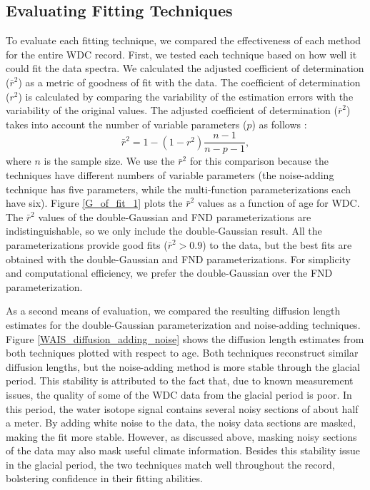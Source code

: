 \documentclass[draft, jgrga]{AGUTeX}
\begin{document}
\begin{article}
\section{Evaluating Fitting Techniques}
To evaluate each fitting technique, we compared the effectiveness of each method for the entire WDC record. First, we tested each technique based on how well it could fit the data spectra. We calculated the adjusted coefficient of determination ($\bar{r}^2$) as a metric of goodness of fit with the data. The coefficient of determination ($r^2$) is calculated by comparing the variability of the estimation errors with the variability of the original values. The adjusted coefficient of determination ($\bar{r}^2$) takes into account the number of variable parameters ($p$) as follows \citep{Theil1961}:
\begin{equation}
\bar{r}^2 = 1 - (1 -r^2) \frac{n - 1}{n - p - 1},
\end{equation}
where $n$ is the sample size. We use the $\bar{r}^2$ for this comparison because the techniques have different numbers of variable parameters (the noise-adding technique has five parameters, while the multi-function parameterizations each have six). Figure \ref{G_of_fit_1} plots the $\bar{r}^2$ values as a function of age for WDC. The $\bar{r}^2$ values of the double-Gaussian and FND parameterizations are indistinguishable, so we only include the double-Gaussian result. All the parameterizations provide good fits ($\bar{r}^2 > 0.9$) to the data, but the best fits are obtained with the double-Gaussian and FND parameterizations. For simplicity and computational efficiency, we prefer the double-Gaussian over the FND parameterization.

As a second means of evaluation, we compared the resulting diffusion length estimates for the double-Gaussian parameterization and noise-adding techniques. Figure \ref{WAIS_diffusion_adding_noise} shows the diffusion length estimates from both techniques plotted with respect to age. Both techniques reconstruct similar diffusion lengths, but the noise-adding method is more stable through the glacial period. This stability is attributed to the fact that, due to known measurement issues, the quality of some of the WDC data from the glacial period is poor. In this period, the water isotope signal contains several noisy sections of about half a meter. By adding white noise to the data, the noisy data sections are masked, making the fit more stable. However, as discussed above, masking noisy sections of the data may also mask useful climate information. Besides this stability issue in the glacial period, the two techniques match well throughout the record, bolstering confidence in their fitting abilities.


\end{article}
\end{document}
